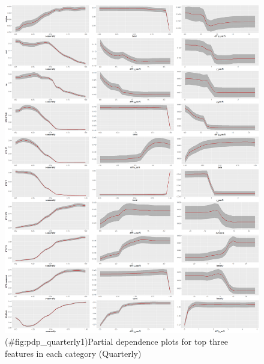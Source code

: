 \documentclass[11pt,a4paper,]{article}
\theoremstyle{definition}
\theoremstyle{definition}
\theoremstyle{definition}
\theoremstyle{remark}
\begin{document}
\newpage

\begin{figure}
\centering
\includegraphics{figures/pdp_quarterly1-1.png}
\caption{(\#fig:pdp\_quarterly1)Partial dependence plots for top three
features in each category (Quarterly)}
\end{figure}

\newpage
\end{document}
